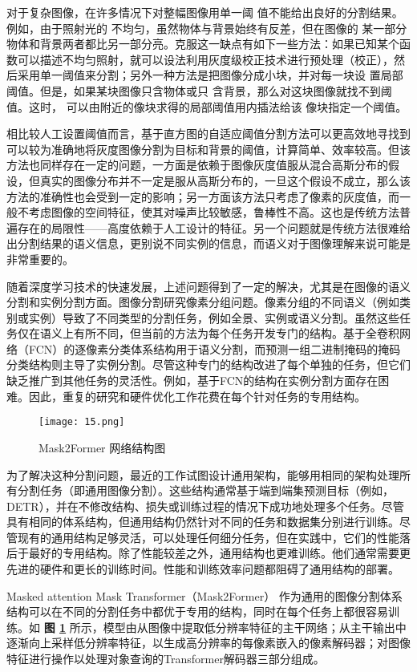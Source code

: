 对于复杂图像，在许多情况下对整幅图像用单一阈 值不能给出良好的分割结果。例如，由于照射光的 不均匀，虽然物体与背景始终有反差，但在图像的 某一部分物体和背景两者都比另一部分亮。克服这一缺点有如下一些方法：如果已知某个函数可以描述不均匀照射，就可以设法利用灰度级校正技术进行预处理（校正），然后采用单一阈值来分割；另外一种方法是把图像分成小块，并对每一块设 置局部阈值。但是，如果某块图像只含物体或只 含背景，那么对这块图像就找不到阈值。这时， 可以由附近的像块求得的局部阈值用内插法给该 像块指定一个阈值。

相比较人工设置阈值而言，基于直方图的自适应阈值分割方法可以更高效地寻找到可以较为准确地将灰度图像分割为目标和背景的阈值，计算简单、效率较高。但该方法也同样存在一定的问题，一方面是依赖于图像灰度值服从混合高斯分布的假设，但真实的图像分布并不一定是服从高斯分布的，一旦这个假设不成立，那么该方法的准确性也会受到一定的影响；另一方面该方法只考虑了像素的灰度值，而一般不考虑图像的空间特征，使其对噪声比较敏感，鲁棒性不高。这也是传统方法普遍存在的局限性——高度依赖于人工设计的特征。另一个问题就是传统方法很难给出分割结果的语义信息，更别说不同实例的信息，而语义对于图像理解来说可能是非常重要的。

随着深度学习技术的快速发展，上述问题得到了一定的解决，尤其是在图像的语义分割和实例分割方面。图像分割研究像素分组问题。像素分组的不同语义（例如类别或实例）导致了不同类型的分割任务，例如全景、实例或语义分割。虽然这些任务仅在语义上有所不同，但当前的方法为每个任务开发专门的结构。基于全卷积网络（FCN）的逐像素分类体系结构用于语义分割，而预测一组二进制掩码的掩码分类结构则主导了实例分割。尽管这种专门的结构改进了每个单独的任务，但它们缺乏推广到其他任务的灵活性。例如，基于FCN的结构在实例分割方面存在困难。因此，重复的研究和硬件优化工作花费在每个针对任务的专用结构。

\begin{figure}[!tbp]
	\centering
	\texttt{[image: 15.png]}
	\caption{Mask2Former 网络结构图}
	\label{fig:fig15}
\end{figure}

为了解决这种分割问题，最近的工作试图设计通用架构，能够用相同的架构处理所有分割任务（即通用图像分割）。这些结构通常基于端到端集预测目标（例如，DETR），并在不修改结构、损失或训练过程的情况下成功地处理多个任务。尽管具有相同的体系结构，但通用结构仍然针对不同的任务和数据集分别进行训练。尽管现有的通用结构足够灵活，可以处理任何细分任务，但在实践中，它们的性能落后于最好的专用结构。除了性能较差之外，通用结构也更难训练。他们通常需要更先进的硬件和更长的训练时间。性能和训练效率问题都阻碍了通用结构的部署。

Masked attention Mask Transformer（Mask2Former） \cite{DBLP:conf/cvpr/ChengMSKG22}作为通用的图像分割体系结构可以在不同的分割任务中都优于专用的结构，同时在每个任务上都很容易训练。如 \textbf{图 \ref{fig:fig15}} 所示，模型由从图像中提取低分辨率特征的主干网络；从主干输出中逐渐向上采样低分辨率特征，以生成高分辨率的每像素嵌入的像素解码器；对图像特征进行操作以处理对象查询的Transformer解码器三部分组成。

